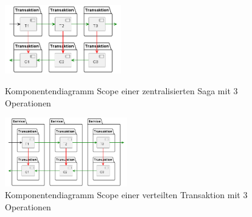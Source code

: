 \begin{figure}[!htbp]
	\begin{minipage}{.45\textwidth}
		\centering
		\includegraphics[height=3cm]{figures/ChapterSaga/TransactionScopeSaga-0.png}
		\caption{\small Komponentendiagramm Scope einer zentralisierten Saga mit 3 Operationen}
		\label{fig:transactionscope-saga2}
	\end{minipage}
	\begin{minipage}{.45\textwidth}
		\centering
		\includegraphics[height=3cm]{figures/ChapterSaga/TransactionScopeDistributedSaga-0.png}
		\caption{\small Komponentendiagramm Scope einer verteilten Transaktion mit 3 Operationen}
		\label{fig:transactionscope-distributed}
	\end{minipage}\hspace{\fill}
\end{figure}
\FloatBarrier
